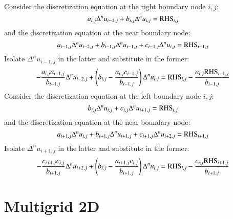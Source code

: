 \documentclass{warpdoc}
\begin{document}
Consider the discretization equation at the right boundary node $i,j$:
%
\begin{equation}
   a_{i,j} \Delta^n u_{i-1,j} 
+  b_{i,j} \Delta^n u_{i,j} 
=  {\rm RHS}_{i,j}  
\end{equation}
%
and the discretization equation at the near boundary node:
%
\begin{equation}
   a_{i-1,j} \Delta^n u_{i-2,j} 
+  b_{i-1,j} \Delta^n u_{i-1,j} 
+  c_{i-1,j} \Delta^n u_{i,j} 
= {\rm RHS}_{i-1,j}  
\end{equation}
%
Isolate $\Delta^n u_{i-1,j}$ in the latter and substitute in the former:
%
\begin{equation}
-  \frac{a_{i,j} a_{i-1,j}}{b_{i-1,j}} \Delta^n u_{i-2,j} 
+  \left( b_{i,j} -  \frac{a_{i,j} c_{i-1,j}}{b_{i-1,j}}\right) \Delta^n u_{i,j} 
=  {\rm RHS}_{i,j}  
-\frac{a_{i,j} {\rm RHS}_{i-1,j}}{b_{i-1,j}}  
\end{equation}
%
Consider the discretization equation at the left boundary node $i,j$:
%
\begin{equation}
   b_{i,j} \Delta^n u_{i,j} 
+  c_{i,j} \Delta^n u_{i+1,j} 
=  {\rm RHS}_{i,j}  
\end{equation}
%
and the discretization equation at the near boundary node:
%
\begin{equation}
   a_{i+1,j} \Delta^n u_{i,j} 
+  b_{i+1,j} \Delta^n u_{i+1,j} 
+  c_{i+1,j} \Delta^n u_{i+2,j} 
= {\rm RHS}_{i+1,j}  
\end{equation}
%
Isolate $\Delta^n u_{i+1,j}$ in the latter and substitute in the former:
%
\begin{equation}
-  \frac{c_{i+1,j}c_{i,j}}{b_{i+1,j}} \Delta^n u_{i+2,j} 
+ \left( b_{i,j} -  \frac{a_{i+1,j}c_{i,j}}{b_{i+1,j}}  \right)\Delta^n u_{i,j} 
=  {\rm RHS}_{i,j}  
 -\frac{c_{i,j} {\rm RHS}_{i+1,j}}{b_{i+1,j}}  
\end{equation}
%





\section{Multigrid 2D}
\end{document}
